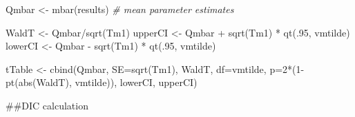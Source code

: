 \documentclass[
]{article}
\newenvironment{Shaded}{\begin{snugshade}}{\end{snugshade}}
\newcommand{\AttributeTok}[1]{\textcolor[rgb]{0.77,0.63,0.00}{#1}}
\newcommand{\CommentTok}[1]{\textcolor[rgb]{0.56,0.35,0.01}{\textit{#1}}}
\newcommand{\ControlFlowTok}[1]{\textcolor[rgb]{0.13,0.29,0.53}{\textbf{#1}}}
\newcommand{\DecValTok}[1]{\textcolor[rgb]{0.00,0.00,0.81}{#1}}
\newcommand{\FunctionTok}[1]{\textcolor[rgb]{0.00,0.00,0.00}{#1}}
\newcommand{\NormalTok}[1]{#1}
\newcommand{\OtherTok}[1]{\textcolor[rgb]{0.56,0.35,0.01}{#1}}
\newcommand{\SpecialCharTok}[1]{\textcolor[rgb]{0.00,0.00,0.00}{#1}}
\newcommand{\StringTok}[1]{\textcolor[rgb]{0.31,0.60,0.02}{#1}}
\begin{document}
\begin{Shaded}
\begin{Highlighting}[]
\NormalTok{Qmbar }\OtherTok{\textless{}{-}} \FunctionTok{mbar}\NormalTok{(results) }\CommentTok{\# mean parameter estimates}

\NormalTok{WaldT }\OtherTok{\textless{}{-}}\NormalTok{ Qmbar}\SpecialCharTok{/}\FunctionTok{sqrt}\NormalTok{(Tm1)}
\NormalTok{upperCI }\OtherTok{\textless{}{-}}\NormalTok{ Qmbar }\SpecialCharTok{+} \FunctionTok{sqrt}\NormalTok{(Tm1) }\SpecialCharTok{*} \FunctionTok{qt}\NormalTok{(.}\DecValTok{95}\NormalTok{, vmtilde)}
\NormalTok{lowerCI }\OtherTok{\textless{}{-}}\NormalTok{  Qmbar }\SpecialCharTok{{-}} \FunctionTok{sqrt}\NormalTok{(Tm1) }\SpecialCharTok{*} \FunctionTok{qt}\NormalTok{(.}\DecValTok{95}\NormalTok{, vmtilde)}

\NormalTok{tTable }\OtherTok{\textless{}{-}} \FunctionTok{cbind}\NormalTok{(Qmbar, }\AttributeTok{SE=}\FunctionTok{sqrt}\NormalTok{(Tm1), WaldT,}
                \AttributeTok{df=}\NormalTok{vmtilde, }\AttributeTok{p=}\DecValTok{2}\SpecialCharTok{*}\NormalTok{(}\DecValTok{1}\SpecialCharTok{{-}}\FunctionTok{pt}\NormalTok{(}\FunctionTok{abs}\NormalTok{(WaldT),}
\NormalTok{                                    vmtilde)), lowerCI, upperCI)}
\end{Highlighting}
\end{Shaded}

\#\#DIC calculation

\begin{Shaded}
\end{Shaded}
\end{document}
